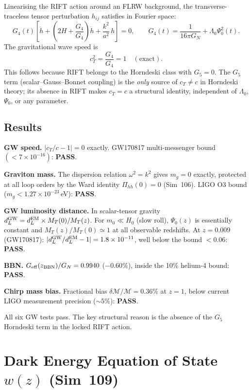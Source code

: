 \documentclass[12pt,a4paper]{article}
\begin{document}
Linearising the RIFT action around an FLRW background, the transverse-traceless
tensor perturbation $h_{ij}$ satisfies in Fourier space:
\begin{equation}
  G_4(t)\left[\ddot{h} + \left(2H + \frac{\dot{G}_4}{G_4}\right)\dot{h}
  + \frac{k^2}{a^2}\,h\right] = 0,
  \qquad
  G_4(t) = \frac{1}{16\pi G_N} + \Lambda_0\Psi_0^2(t).
\end{equation}
The gravitational wave speed is
\begin{equation}
  c_T^2 = \frac{G_4}{G_4} = 1 \quad (\text{exact}).
\end{equation}
This follows because RIFT belongs to the Horndeski class with $G_5=0$.
The $G_5$ term (scalar--Gauss--Bonnet coupling) is the \emph{only}
source of $c_T\ne c$ in Horndeski theory; its absence in RIFT makes
$c_T=c$ a structural identity, independent of $\Lambda_0$, $\Psi_0$,
or any parameter.

\subsection{Results}

\textbf{GW speed.} $|c_T/c - 1| = 0$ exactly.
GW170817 multi-messenger bound $(<7\times10^{-16})$: \textbf{PASS}.

\textbf{Graviton mass.} The dispersion relation $\omega^2=k^2$ gives $m_g=0$
exactly, protected at all loop orders by the Ward identity
$\Pi_{hh}(0)=0$ (Sim~106).  LIGO O3 bound ($m_g<1.27\times10^{-23}$\,eV):
\textbf{PASS}.

\textbf{GW luminosity distance.}
In scalar-tensor gravity $d_L^{\rm GW} = d_L^{\rm EM}\times M_T(0)/M_T(z)$.
For $m_0\ll H_0$ (slow roll), $\Psi_0(z)$ is essentially constant and
$M_T(z)/M_T(0)\simeq1$ at all observable redshifts.
At $z=0.009$ (GW170817): $|d_L^{\rm GW}/d_L^{\rm EM}-1|=1.8\times10^{-11}$,
well below the bound $<0.06$: \textbf{PASS}.

\textbf{BBN.} $G_{\rm eff}(z_{\rm BBN})/G_N = 0.9940$ ($-0.60\%$),
inside the 10\% helium-4 bound: \textbf{PASS}.

\textbf{Chirp mass bias.} Fractional bias $\delta\mathcal{M}/\mathcal{M}=0.36\%$
at $z=1$, below current LIGO measurement precision ($\sim5\%$): \textbf{PASS}.

All six GW tests pass.  The key structural reason is the absence of the $G_5$
Horndeski term in the locked RIFT action.

\section{Dark Energy Equation of State $w(z)$ (Sim~109)}
\label{sec:sim109}
\end{document}
